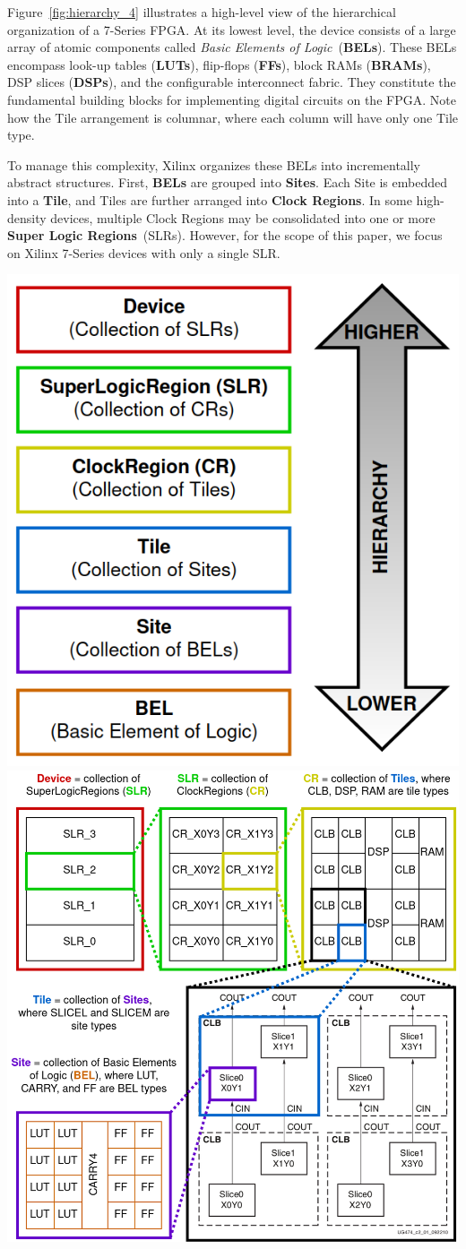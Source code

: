 \documentclass{article}
\begin{document}
\begin{multicols}{2}
    Figure~\ref{fig:hierarchy_4} illustrates a high-level view of the hierarchical organization of a 7-Series FPGA. 
    At its lowest level, the device consists of a large array of atomic components called \emph{Basic Elements of Logic}~(\textbf{BELs}). 
    These BELs encompass look-up tables (\textbf{LUTs}), flip-flops (\textbf{FFs}), block RAMs (\textbf{BRAMs}), DSP slices (\textbf{DSPs}), and the configurable interconnect fabric. 
    They constitute the fundamental building blocks for implementing digital circuits on the FPGA.
    Note how the Tile arrangement is columnar, where each column will have only one Tile type. 

    To manage this complexity, Xilinx organizes these BELs into incrementally abstract structures. 
    First, \textbf{BELs} are grouped into \textbf{Sites}. 
    Each Site is embedded into a \textbf{Tile}, and Tiles are further arranged into \textbf{Clock Regions}. 
    In some high-density devices, multiple Clock Regions may be consolidated into one or more \textbf{Super Logic Regions}~(SLRs). 
    However, for the scope of this paper, we focus on Xilinx 7-Series devices with only a single SLR.

    \end{multicols}
    {
        \centering
        \includegraphics[valign=c, width=0.3\columnwidth]{figures/hierarchy_5.png}
        \includegraphics[valign=c, width=0.6\columnwidth]{figures/hierarchy_4.png}
        \label{fig:hierarchy_4}
    }
\end{document}
